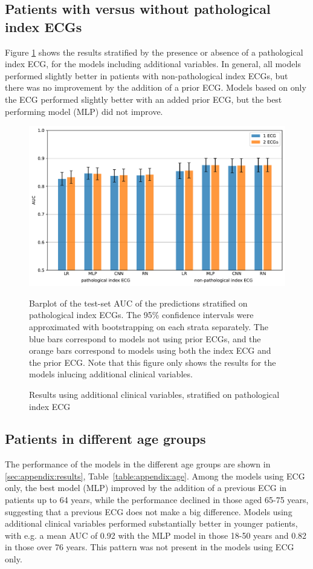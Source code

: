\documentclass[preprint]{elsarticle}
\begin{document}
\subsection{Patients with versus without pathological index ECGs}
Figure \ref{fig:pathresults} shows the results stratified by the presence or absence of a pathological index ECG, for the models including additional variables. In general, all models performed slightly better in patients with non-pathological index ECGs, but there was no improvement by the addition of a prior ECG. Models based on only the ECG performed slightly better with an added prior ECG, but the best performing model (MLP) did not improve. 

\begin{figure}[h!]
\includegraphics[width=\linewidth]{path_results.pdf}
\caption{Results using additional clinical variables, stratified on pathological index ECG}
\medskip
\small
Barplot of the test-set AUC of the predictions stratified on pathological index ECGs. The 95\% confidence intervals were approximated with bootstrapping on each strata separately. The blue bars correspond to models not using prior ECGs, and the orange bars correspond to models using both the index ECG and the prior ECG. Note that this figure only shows the results for the models inlucing additional clinical variables.
\label{fig:pathresults}
\end{figure}

\subsection{Patients in different age groups}
The performance of the models in the different age groups are shown in \ref{sec:appendix:results}, Table~\ref{table:appendix:age}. Among the models using ECG only, the best model (MLP) improved by the addition of a previous ECG in patients up to 64 years, while the performance declined in those aged 65-75 years, suggesting that a previous ECG does not make a big difference. Models using additional clinical variables performed substantially better in younger patients, with e.g. a mean AUC of 0.92 with the MLP model in those 18-50 years and 0.82 in those over 76 years. This pattern was not present in the models using ECG only.
\end{document}
